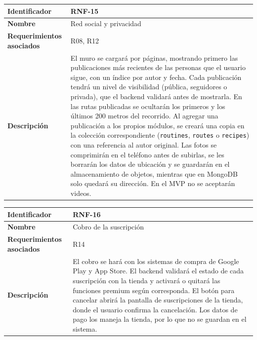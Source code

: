 \begin{table}[h!]
    \centering
    \renewcommand{\arraystretch}{1.3}
    \begin{tabular}{|p{3.5cm}|p{11.5cm}|}
        \hline
        \rowcolor[HTML]{EFEFEF}
        \textbf{Identificador} & \textbf{RNF-15} \\ \hline
        \textbf{Nombre} & Red social y privacidad \\ \hline
        \textbf{Requerimientos asociados} & R08, R12 \\ \hline
        \textbf{Descripción} & El muro se cargará por páginas, mostrando primero las publicaciones más recientes de las personas que el usuario sigue, con un índice por autor y fecha. Cada publicación tendrá un nivel de visibilidad (pública, seguidores o privada), que el backend validará antes de mostrarla. En las rutas publicadas se ocultarán los primeros y los últimos 200 metros del recorrido. Al agregar una publicación a los propios módulos, se creará una copia en la colección correspondiente (\texttt{routines}, \texttt{routes} o \texttt{recipes}) con una referencia al autor original. Las fotos se comprimirán en el teléfono antes de subirlas, se les borrarán los datos de ubicación y se guardarán en el almacenamiento de objetos, mientras que en MongoDB solo quedará su dirección. En el MVP no se aceptarán videos. \\ \hline
    \end{tabular}
\end{table}
\newpage
\begin{table}[h!]
    \centering
    \renewcommand{\arraystretch}{1.3}
    \begin{tabular}{|p{3.5cm}|p{11.5cm}|}
        \hline
        \rowcolor[HTML]{EFEFEF}
        \textbf{Identificador} & \textbf{RNF-16} \\ \hline
        \textbf{Nombre} & Cobro de la suscripción \\ \hline
        \textbf{Requerimientos asociados} & R14 \\ \hline
        \textbf{Descripción} & El cobro se hará con los sistemas de compra de Google Play y App Store. El backend validará el estado de cada suscripción con la tienda y activará o quitará las funciones premium según corresponda. El botón para cancelar abrirá la pantalla de suscripciones de la tienda, donde el usuario confirma la cancelación. Los datos de pago los maneja la tienda, por lo que no se guardan en el sistema. \\ \hline
    \end{tabular}
\end{table}

